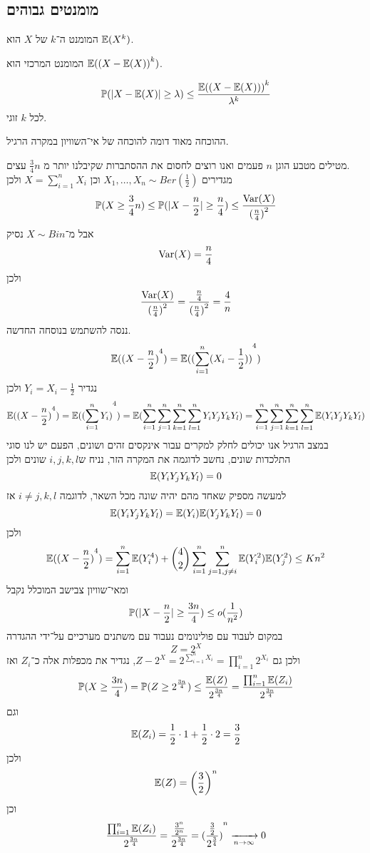 \subsection{מומנטים גבוהים}
\begin{definition}[מומנט]
	המומנט ה־$k$ של $X$ הוא $\mathbb{E}(X^k)$.
\end{definition}
\begin{definition}
	המומנט המרכזי הוא $\mathbb{E}({(X - \mathbb{E}(X))}^k)$.
\end{definition}
\begin{proposition}
	\[
		\mathbb{P}(|X - \mathbb{E}(X)| \ge \lambda) \le \frac{\mathbb{E}({(X - \mathbb{E}(X)))}^k}{\lambda^k}
	\]
	לכל $k$ זוגי.
\end{proposition}
ההוכחה מאוד דומה להוכחה של אי־השוויון במקרה הרגיל.
\begin{example}
	מטילים מטבע הוגן $n$ פעמים ואנו רוצים לחסום את ההסתברות שקיבלנו יותר מ $\frac{3}{4}n$ עצים. \\
	מגדירים $X_1, \dots, X_n \sim Ber(\frac{1}{2})$ וכן $X = \sum_{i = 1}^n X_i$ ולכן
	\[
		\mathbb{P}(X \ge \frac{3}{4}n)
		\le \mathbb{P}(|X - \frac{n}{2}| \ge \frac{n}{4})
		\le \frac{\operatorname{Var}(X)}{{(\frac{n}{4})}^2}
	\]
	אבל מ־$X \sim Bin$ נסיק
	\[
		\operatorname{Var}(X) = \frac{n}{4}
	\]
	ולכן
	\[
		\frac{\operatorname{Var}(X)}{{(\frac{n}{4})}^2}
		= \frac{\frac{n}{4}}{{(\frac{n}{4})}^2}
		= \frac{4}{n}
	\]
	ננסה להשתמש בנוסחה החדשה.
	\[
		\mathbb{E}({(X - \frac{n}{2})}^4)
		= \mathbb{E}({(\sum_{i = 1}^{n}  (X_i - \frac{1}{2}))}^4)
	\]
	נגדיר $Y_i = X_i - \frac{1}{2}$ ולכן
	\[
		\mathbb{E}({(X - \frac{n}{2})}^4)
		= \mathbb{E}({(\sum_{i = 1}^{n} Y_i)}^4)
		= \mathbb{E}(\sum_{i = 1}^{n} \sum_{j = 1}^{n} \sum_{k = 1}^{n} \sum_{l = 1}^{n} Y_i Y_j Y_k Y_l)
		= \sum_{i = 1}^{n} \sum_{j = 1}^{n} \sum_{k = 1}^{n} \sum_{l = 1}^{n} \mathbb{E}(Y_i Y_j Y_k Y_l)
	\]
	במצב הרגיל אנו יכולים לחלק למקרים עבור אינקסים זהים ושונים, הפעם יש לנו סוגי התלכדות שונים, נחשב לדוגמה את המקרה הזר, נניח ש$i, j, k, l$ שונים ולכן
	\[
		\mathbb{E}(Y_i Y_j Y_k Y_l) = 0
	\]
	למעשה מספיק שאחד מהם יהיה שונה מכל השאר, לדוגמה $i \ne j, k, l$ אז
	\[
		\mathbb{E}(Y_i Y_j Y_k Y_l)
		= \mathbb{E}(Y_i) \mathbb{E}(Y_j Y_k Y_l)
		= 0
	\]
	ולכן
	\[
		\mathbb{E}({(X - \frac{n}{2})}^4)
		= \sum_{i = 1}^{n} \mathbb{E}(Y_i^4)
		+ \binom{4}{2} \sum_{i = 1}^{n} \sum_{j = 1, j \ne i}^{n} \mathbb{E}(Y_i^2) \mathbb{E}(Y_j^2)
		\le K n^2
	\]
	ומאי־שוויון צבישב המוכלל נקבל
	\[
		\mathbb{P}(|X - \frac{n}{2}| \ge \frac{3n}{4})
		\le o(\frac{1}{n^2})
	\]
	במקום לעבוד עם פולינומים נעבוד עם משתנים מערכיים על־ידי ההגדרה
	\[
		Z = 2^X
	\]
	ולכן גם $Z - 2^X = 2^{\sum_{i = 1}^{n} X_i} = \prod_{i = 1}^n 2^{X_i}$, נגדיר את מכפלות אלה כ־$Z_i$ ואז
	\[
		\mathbb{P}(X \ge \frac{3n}{4})
		= \mathbb{P}(Z \ge 2^{\frac{3n}{4}})
		\le \frac{\mathbb{E}(Z)}{2^{\frac{3n}{4}}}
		= \frac{\prod_{i = 1}^n \mathbb{E}(Z_i)}{2^{\frac{3n}{4}}}
	\]
	וגם
	\[
		\mathbb{E}(Z_i) = \frac{1}{2} \cdot 1 + \frac{1}{2} \cdot 2 = \frac{3}{2}
	\]
	ולכן
	\[
		\mathbb{E}(Z) = {\left(\frac{3}{2}\right)}^n
	\]
	וכן
	\[
		\frac{\prod_{i = 1}^n \mathbb{E}(Z_i)}{2^{\frac{3n}{4}}}
		= \frac{\frac{3^n}{2^n}}{2^{\frac{3n}{4}}}
		= {(\frac{\frac{3}{2}}{2^{\frac{3}{4}}})}^n
		\xrightarrow[n \to \infty]{} 0
	\]
\end{example}
